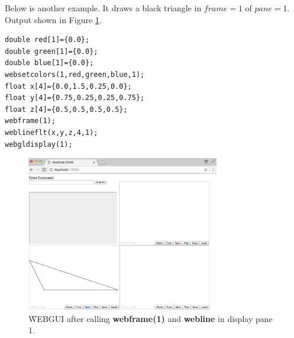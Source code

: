 Below is another example. It draws a black triangle in $frame=1$ of $pane=1$. Output shown in Figure \ref{fig:9}.
\begin{verbatim}
double red[1]={0.0};
double green[1]={0.0};
double blue[1]={0.0};
websetcolors(1,red,green,blue,1);
float x[4]={0.0,1.5,0.25,0.0};
float y[4]={0.75,0.25,0.25,0.75};
float z[4]={0.5,0.5,0.5,0.5};
webframe(1);
weblineflt(x,y,z,4,1);
webgldisplay(1);
\end{verbatim}
\begin{figure}[H]
\centering
\includegraphics[width=0.75\textwidth]{pix/lines2.png}
\caption{\f{WEBGUI} after calling \textbf{webframe(1)} and \textbf{webline} in display pane 1.}
\label{fig:9}
\end{figure}

\newpage
